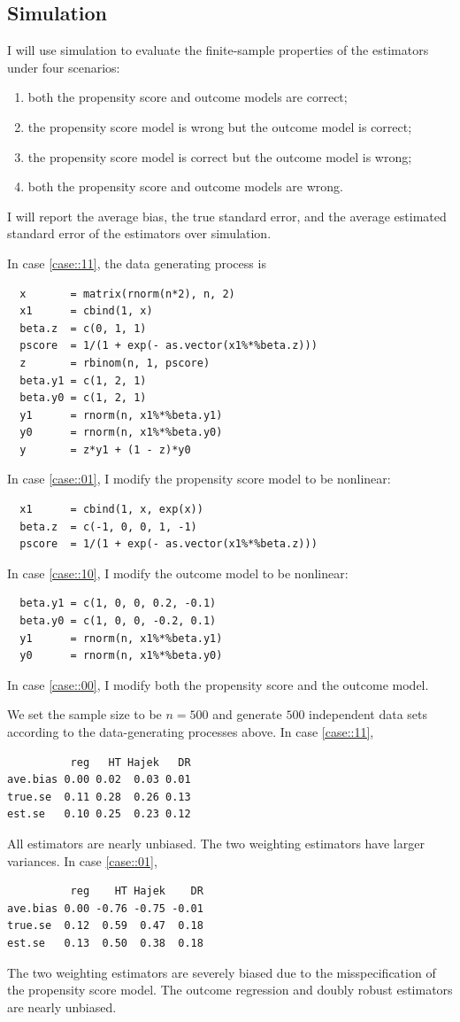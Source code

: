 \subsection{Simulation}
\label{sec::dr-simulation}


I will use simulation to evaluate the finite-sample properties of the estimators under four scenarios:
\begin{enumerate}
\item\label{case::11}
both the propensity score and outcome models are correct;
\item\label{case::01}
the propensity score model is wrong but the outcome model is correct;
\item\label{case::10}
the propensity score model is correct but the outcome model is wrong;
\item\label{case::00}
both the propensity score and outcome models are wrong.
\end{enumerate}
I will report the average bias, the true standard error, and the average estimated standard error of the estimators over simulation. 



In case \ref{case::11}, the data generating process is
\begin{lstlisting}
  x       = matrix(rnorm(n*2), n, 2)
  x1      = cbind(1, x)
  beta.z  = c(0, 1, 1)
  pscore  = 1/(1 + exp(- as.vector(x1%*%beta.z)))
  z       = rbinom(n, 1, pscore)
  beta.y1 = c(1, 2, 1)
  beta.y0 = c(1, 2, 1)
  y1      = rnorm(n, x1%*%beta.y1)
  y0      = rnorm(n, x1%*%beta.y0)
  y       = z*y1 + (1 - z)*y0
\end{lstlisting}
In case \ref{case::01}, I modify the propensity score model to be nonlinear:
\begin{lstlisting}
  x1      = cbind(1, x, exp(x))
  beta.z  = c(-1, 0, 0, 1, -1)
  pscore  = 1/(1 + exp(- as.vector(x1%*%beta.z)))
\end{lstlisting}
In case \ref{case::10}, I modify the outcome model to be nonlinear: 
\begin{lstlisting}
  beta.y1 = c(1, 0, 0, 0.2, -0.1)
  beta.y0 = c(1, 0, 0, -0.2, 0.1)
  y1      = rnorm(n, x1%*%beta.y1)
  y0      = rnorm(n, x1%*%beta.y0)
\end{lstlisting}
In case \ref{case::00}, I modify both the propensity score and the outcome model. 


We set the sample size to be $n=500$ and generate $500$ independent data sets according to the data-generating processes above. 
In case \ref{case::11}, 
\begin{lstlisting}
          reg   HT Hajek   DR
ave.bias 0.00 0.02  0.03 0.01
true.se  0.11 0.28  0.26 0.13
est.se   0.10 0.25  0.23 0.12
\end{lstlisting}
All estimators are nearly unbiased. The two weighting estimators have larger variances. 
In case \ref{case::01},
\begin{lstlisting}
          reg    HT Hajek    DR
ave.bias 0.00 -0.76 -0.75 -0.01
true.se  0.12  0.59  0.47  0.18
est.se   0.13  0.50  0.38  0.18
\end{lstlisting}
The two weighting estimators are severely biased due to the misspecification of the propensity score model. The outcome regression and doubly robust estimators are nearly unbiased. 


